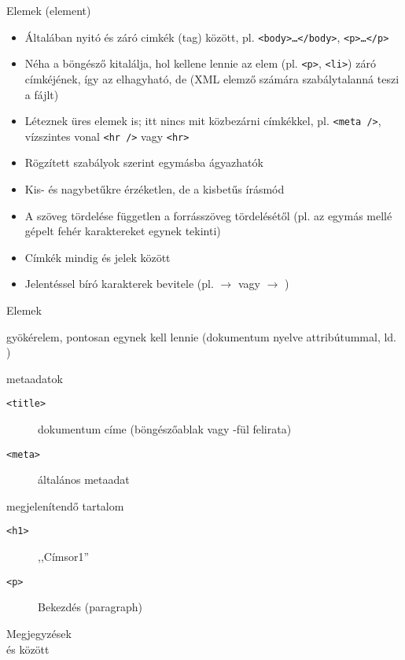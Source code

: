 \begin{frame}
  Elemek (element)
  \begin{itemize}
    \item Általában nyitó és záró cimkék (tag) között, pl. \texttt{<body>\dots</body>}, \texttt{<p>\dots</p>}
    \item Néha a böngésző kitalálja, hol kellene lennie az elem (pl. \texttt{<p>}, \texttt{<li>}) záró címkéjének, így az elhagyható, de  (XML elemző számára szabálytalanná teszi a fájlt)
    \item Léteznek üres elemek is; itt nincs mit közbezárni címkékkel, pl. \texttt{<meta />}, vízszintes vonal \texttt{<hr~/>} vagy \texttt{<hr>}
    \item Rögzített szabályok szerint egymásba ágyazhatók
    \item Kis- és nagybetűkre érzéketlen, de  a kisbetűs írásmód
    \item A szöveg tördelése független a forrásszöveg tördelésétől (pl. az egymás mellé gépelt fehér karaktereket egynek tekinti)
    \item Címkék mindig \kiemel{<} és \kiemel{>} jelek között
    \item Jelentéssel bíró karakterek bevitele  (pl. \kiemel{<} $\to$  vagy \kiemel{>} $\to$ )
  \end{itemize}
\end{frame}

\begin{frame}
  Elemek
  \begin{description}[m]
    \item[\texttt{<html>}] gyökérelem, pontosan egynek kell lennie (dokumentum nyelve attribútummal, ld. )
    \item[\texttt{<head>}] metaadatok
    \begin{description}
      \item[\texttt{<title>}] dokumentum címe (böngészőablak vagy -fül felirata)
      \item[\texttt{<meta>}] általános metaadat
    \end{description}
    \item[\texttt{<body>}] megjelenítendő tartalom
    \begin{description}
      \item[\texttt{<h1>}] ,,Címsor1''
      \item[\texttt{<p>}] Bekezdés (paragraph)
    \end{description}
  \end{description}
  \vfill
  Megjegyzések\\
  \kiemel{\texttt{<!{-}-}} és \kiemel{\texttt{{-}->}} között 
\end{frame}

